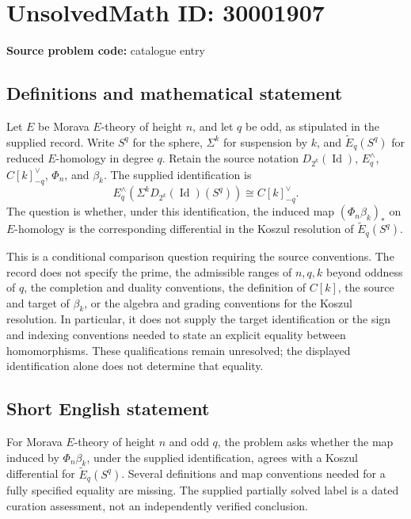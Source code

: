 \documentclass[11pt]{article}
\begin{document}
\section*{UnsolvedMath ID: 30001907}
\textbf{Source problem code:} catalogue entry
\subsection{Definitions and mathematical statement}
Let \(E\) be Morava \(E\)-theory of height \(n\), and let \(q\) be odd, as stipulated in the supplied record. Write \(S^q\) for the sphere, \(\Sigma^k\) for suspension by \(k\), and \(\widetilde E_q(S^q)\) for reduced \(E\)-homology in degree \(q\). Retain the source notation \(D_{2^k}(\operatorname{Id})\), \(E_q^{\wedge}\), \(C[k]_{-q}^{\vee}\), \(\Phi_n\), and \(\beta_k\). The supplied identification is
\[
E_q^{\wedge}\!\left(\Sigma^kD_{2^k}(\operatorname{Id})(S^q)\right)
\cong C[k]_{-q}^{\vee}.
\]
The question is whether, under this identification, the induced map \((\Phi_n\beta_k)_*\) on \(E\)-homology is the corresponding differential in the Koszul resolution of \(\widetilde E_q(S^q)\).

This is a conditional comparison question requiring the source conventions. The record does not specify the prime, the admissible ranges of \(n,q,k\) beyond oddness of \(q\), the completion and duality conventions, the definition of \(C[k]\), the source and target of \(\beta_k\), or the algebra and grading conventions for the Koszul resolution. In particular, it does not supply the target identification or the sign and indexing conventions needed to state an explicit equality between homomorphisms. These qualifications remain unresolved; the displayed identification alone does not determine that equality.
\subsection{Short English statement}
For Morava \(E\)-theory of height \(n\) and odd \(q\), the problem asks whether the map induced by \(\Phi_n\beta_k\), under the supplied identification, agrees with a Koszul differential for \(\widetilde E_q(S^q)\). Several definitions and map conventions needed for a fully specified equality are missing. The supplied partially solved label is a dated curation assessment, not an independently verified conclusion.
\end{document}
